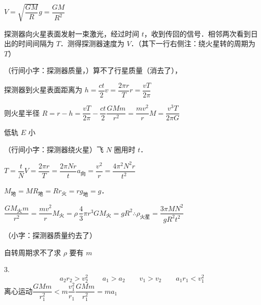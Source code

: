 $V=\sqrt{\dfrac{GM}{R}}$\quad\quad $g=\dfrac{GM}{R^2}$
\begin{problem}[7]
探测器向火星表面发射一束激光，经过时间 $t$，收到传回的信号．相邻两次看到日出的时间间隔为 $T$．测得探测器速度为 $V$．（其下一行右侧注：绕火星转的周期为 $T$）%
\begin{solution}
（行间小字：探测器质量，）算不了行星质量（消去了），%

探测器到火星表面距离为 $h=\dfrac{ct}{2}$\quad $v=\dfrac{2\pi r}{T}$\quad $r=\dfrac{vT}{2\pi}$

则火星半径 $R=r-h=\dfrac{vT}{2\pi}-\dfrac{ct}{2}$\quad $\dfrac{GMm}{r^2}=\dfrac{mv^2}{r}$\quad $M=\dfrac{v^3T}{2\pi G}$%
\end{solution}
\end{problem}
\quad 低轨 $E$ 小
\begin{problem}[9]
（行间小字：探测器绕火星）飞 $N$ 圈用时 $t$．
\begin{solution}
$T=\dfrac tN$\quad $V=\dfrac{2\pi r}{T}=\dfrac{2\pi Nr}{t}$\quad $a_{\text{向}}=\dfrac{v^2}{r}=\dfrac{4\pi^2N^2r}{t^2}$%

$M_{\text{地}}=M$\quad $R_{\text{地}}=R$\quad $r_{\text{火}}=r$\quad $g_{\text{地}}=g$．

$\dfrac{GM_{\text{火}}m}{r^2}=\dfrac{mv^2}{r}$\quad $M_{\text{火}}=\rho\,\dfrac43\pi r^3$\quad $GM_{\text{火}}=gR^2$\quad $\therefore\rho_{\text{火星}}=\dfrac{3\pi MN^2}{gR^2t^2}$%

（小字：探测器质量约去了）

自转周期求不了\quad 求 $\rho$ 要有 $m$%
\end{solution}
\end{problem}
3.
\[
a_2r_2>v_2^2\qquad a_1>a_2\qquad v_1>v_2\qquad a_1r_1<v_1^2
\]
离心运动\quad $\dfrac{GMm}{r_1^2}<m\dfrac{v_1^2}{r_1}$\quad $\dfrac{GMm}{r_1^2}=ma_1$

